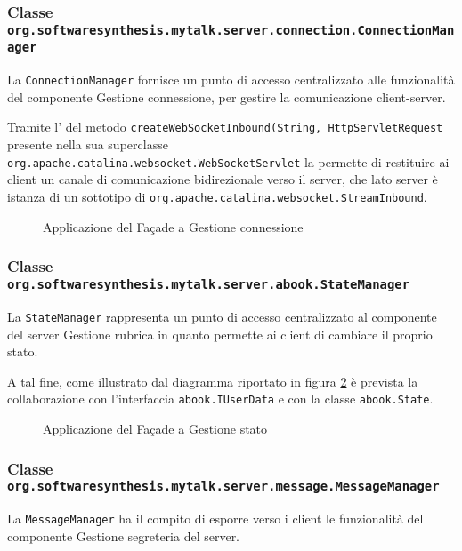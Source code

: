 \subsubsection*{Classe \texttt{org.softwaresynthesis.mytalk.server.connection.ConnectionManager}}
La  \texttt{ConnectionManager} fornisce un punto di accesso centralizzato alle funzionalità del componente \textsf{Gestione connessione}, per gestire la comunicazione client-server.

Tramite l' del metodo \texttt{createWebSocketInbound(String, HttpServletRequest} presente nella sua superclasse \texttt{org.apache.catalina.websocket.WebSocketServlet} la  permette di restituire ai client un canale di comunicazione bidirezionale verso il server, che lato server è istanza di un sottotipo di \texttt{org.apache.catalina.websocket.StreamInbound}.


\begin{figure}[H]
  \centering
  \caption{Applicazione del  Façade a \textsf{Gestione connessione}}\label{fig:facadeconnection}
\end{figure}

\subsubsection*{Classe \texttt{org.softwaresynthesis.mytalk.server.abook.StateManager}}
La  \texttt{StateManager} rappresenta un punto di accesso centralizzato al componente del server \textsf{Gestione rubrica} in quanto permette ai client di cambiare il proprio stato.

A tal fine, come illustrato dal diagramma riportato in figura \ref{fig:facadestate} è prevista la collaborazione con l'interfaccia \texttt{abook.IUserData} e con la classe \texttt{abook.State}.

\begin{figure}[H]
  \centering
  \caption{Applicazione del  Façade a \textsf{Gestione stato}}\label{fig:facadestate}
\end{figure}

\subsubsection*{Classe \texttt{org.softwaresynthesis.mytalk.server.message.MessageManager}}
La  \texttt{MessageManager} ha il compito di esporre verso i client le funzionalità del componente \textsf{Gestione segreteria} del server.

